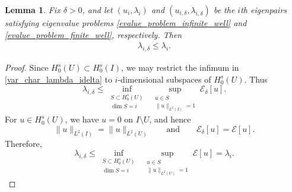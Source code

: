\documentclass[preprint,12pt]{elsarticle}
\newtheorem{lemma}[theorem]{Lemma}
\begin{document}
\begin{lemma}\label{lem_eigenvalue_inequality}
Fix $\delta>0$, and let $(u_i,\lambda_i)$ and
$(u_{i,\delta},\lambda_{i,\delta})$ be the $i$th eigenpairs satisfying
eigenvalue problems \eqref{evalue_problem_infinite_well} and
\eqref{evalue_problem_finite_well}, respectively. Then
\begin{align}\label{eigenvalue_inequality}
    \lambda_{i,\delta}\leq\lambda_i.
\end{align}
\end{lemma}

\begin{proof}
Since $H_0^s(U)\subset H_0^s(I)$, we may restrict the infimum in
\eqref{var_char_lambda_idelta} to $i$-dimensional subspaces of
$H_0^s(U)$. Thus
\[
    \lambda_{i,\delta}
    \leq
    \inf_{\substack{S\subset H_0^s(U)\\ \dim S=i}}
    \;
    \sup_{\substack{u\in S\\ \|u\|_{L^2(I)}=1}}
    \mathcal E_\delta[u].
\]
For $u\in H_0^s(U)$, we have $u=0$ on $I\setminus U$, and hence
\[
    \|u\|_{L^2(I)}
    =
    \|u\|_{L^2(U)}
    \qquad\text{and}\qquad
    \mathcal E_\delta[u]
    =
    \mathcal E[u].
\]
Therefore,
\[
    \lambda_{i,\delta}
    \leq
    \inf_{\substack{S\subset H_0^s(U)\\ \dim S=i}}
    \;
    \sup_{\substack{u\in S\\ \|u\|_{L^2(U)}=1}}
    \mathcal E[u]
    =
    \lambda_i.
\]
\end{proof}
\end{document}
